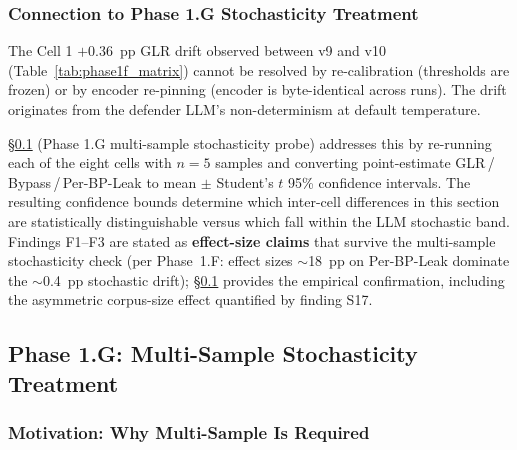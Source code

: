 \documentclass[journal]{IEEEtran}
\begin{document}
\subsubsection{Connection to Phase 1.G Stochasticity Treatment}
\label{Sect:V_A_7_Connection}

The Cell 1 $+0.36$~pp GLR drift observed between v9 and v10 (Table~\ref{tab:phase1f_matrix}) cannot be resolved by re-calibration (thresholds are frozen) or by encoder re-pinning (encoder is byte-identical across runs). The drift originates from the defender LLM's non-determinism at default temperature.

\S\ref{Sect:V_B_Phase1G} (Phase 1.G multi-sample stochasticity probe) addresses this by re-running each of the eight cells with $n{=}5$ samples and converting point-estimate GLR\,/\,Bypass\,/\,Per-BP-Leak to mean $\pm$ Student's $t$ 95\% confidence intervals. The resulting confidence bounds determine which inter-cell differences in this section are statistically distinguishable versus which fall within the LLM stochastic band. Findings F1--F3 are stated as \textbf{effect-size claims} that survive the multi-sample stochasticity check (per Phase~1.F: effect sizes $\sim$18~pp on Per-BP-Leak dominate the $\sim$0.4~pp stochastic drift); \S\ref{Sect:V_B_Phase1G} provides the empirical confirmation, including the asymmetric corpus-size effect quantified by finding S17.

\subsection{Phase 1.G: Multi-Sample Stochasticity Treatment}
\label{Sect:V_B_Phase1G}


\subsubsection{Motivation: Why Multi-Sample Is Required}
\label{Sect:V_B_1_Motivation}
\end{document}
